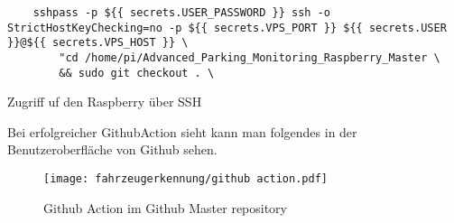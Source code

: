 \begin{listing}[H]
    \begin{verbatim}
    sshpass -p ${{ secrets.USER_PASSWORD }} ssh -o StrictHostKeyChecking=no -p ${{ secrets.VPS_PORT }} ${{ secrets.USER }}@${{ secrets.VPS_HOST }} \
        "cd /home/pi/Advanced_Parking_Monitoring_Raspberry_Master \
        && sudo git checkout . \
    \end{verbatim}
    \caption{Zugriff uf den Raspberry über SSH}
\end{listing}

Bei erfolgreicher GithubAction sieht kann man folgendes in der Benutzeroberfläche von Github sehen.

\begin{figure}[H]
    \centering
    \texttt{[image: fahrzeugerkennung/github action.pdf]}
    \caption{Github Action im Github Master repository}
\end{figure}


\pagebreak


